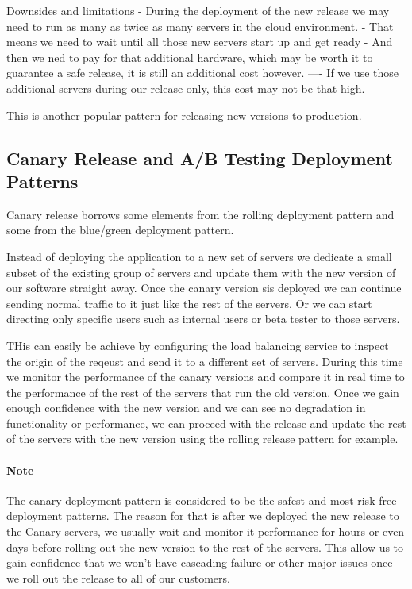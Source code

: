 \documentclass[a4paper, 11pt]{book}
\begin{document}
    Downsides and limitations
    - During the deployment of the new release we may need to run as many as twice as many servers in the cloud environment.
    - That means we need to wait until all those new servers start up and get ready
    - And then we ned to pay for that additional hardware, which may be worth it to guarantee a safe release, it is still an additional cost however.
    ---- If we use those additional servers during our release only, this cost may not be that high.

    This is another popular pattern for releasing new versions to production.

    \subsection{Canary Release and A/B Testing Deployment Patterns}
    Canary release borrows some elements from the rolling deployment pattern and some from the blue/green deployment pattern.

    Instead of deploying the application to a new set of servers we dedicate a small subset of the existing group of servers and update them with the new version of our software straight away.
    Once the canary version sis deployed we can continue sending normal traffic to it just like the rest of the servers.
    Or we can start directing only specific users such as internal users or beta tester to those servers.

    THis can easily be achieve by configuring the load balancing service to inspect the origin of the reqeust and send it to a different set of servers.
    During this time we monitor the performance of the canary versions and compare it in real time to the performance of the rest of the servers that run the old version.
    Once we gain enough confidence with the new version and we can see no degradation in functionality or performance, we can proceed with the release and update the rest of the servers with the new version using the rolling release pattern for example.

    \paragraph{Note} The canary deployment pattern is considered to be the safest and most risk free deployment patterns.
    The reason for that is after we deployed the new release to the Canary servers, we usually wait and monitor it performance for hours or even days before rolling out the new version to the rest of the servers.
    This allow us to gain confidence that we won't have cascading failure or other major issues once we roll out the release to all of our customers.
\end{document}
